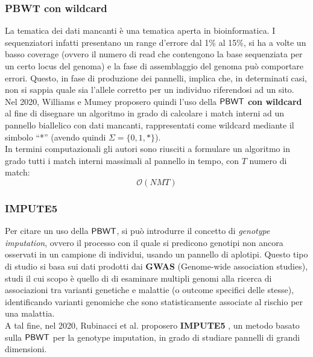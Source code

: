 \subsubsection{PBWT con wildcard}
La tematica dei dati mancanti è una tematica aperta in
bioinformatica. I sequenziatori infatti presentano un range d'errore
dal 1\% al 15\%, si ha a volte un basso coverage (ovvero il numero di
read che contengono la base sequenziata per un certo locus del genoma) e la fase
di assemblaggio del genoma può comportare errori. Questo, in fase di produzione
dei pannelli, implica che, in determinati casi, non si sappia quale sia l'allele
corretto per un individuo riferendosi ad un sito. \\
Nel 2020, Williams e Mumey \cite{williams} proposero quindi l'uso della
$\mbox{\rm {\sf PBWT}}$ \textbf{con 
  wildcard} al fine di disegnare un algoritmo in grado di calcolare i match
interni ad un pannello biallelico con dati mancanti, rappresentati come
wildcard mediante il simbolo ``*'' (avendo quindi
$\Sigma=\{0,1,*\}$).\\ 
In termini computazionali gli autori sono riusciti a formulare un algoritmo in
grado tutti i match interni massimali al pannello in
tempo, con $T$ numero di match: 
\begin{equation}
  \label{eq:pbwtwild}
  \mathcal{O}(NMT)
\end{equation}
\subsubsection{IMPUTE5}
Per citare un uso della $\mbox{\rm {\sf PBWT}}$, si può introdurre il concetto di
\textit{genotype 
  imputation}, ovvero il processo con il quale si predicono genotipi non ancora
osservati in un campione di individui, usando un pannello di aplotipi. Questo
tipo di studio si basa sui dati prodotti dai \textbf{GWAS} (Genome-wide
    association studies), studi il cui scopo è quello di di esaminare multipli
genomi alla ricerca di associazioni tra varianti genetiche e malattie (o
outcome specifici delle stesse), identificando varianti genomiche che sono
statisticamente associate al rischio per una malattia.\\ 
A tal fine, nel 2020, Rubinacci et al. proposero \textbf{IMPUTE5}
\cite{impute5}, un metodo basato sulla $\mbox{\rm {\sf PBWT}}$ per la genotype
  imputation, in grado di studiare pannelli di grandi dimensioni.
